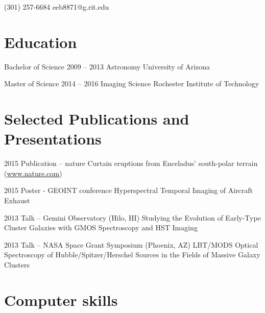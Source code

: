 \documentclass{tccv}
\begin{document}
    {(301) 257-6684}
    {eeb8871@g.rit.edu}

\section{Education}

\begin{yearlist}

\item[Bachelor of Science]{2009 -- 2013}
     {Astronomy}
     {University of Arizona}

\item[Master of Science]{2014 -- 2016}
     {Imaging Science}
     {Rochester Institute of Technology}

\end{yearlist}

\section{Selected Publications and Presentations}

\begin{yearlist}

\item{2015}
	{Publication -- nature}
     {Curtain eruptions from Enceladus' south-polar terrain (\href{http://www.nature.com/nature/journal/v521/n7550/full/nature14368.html}{www.nature.com})}

\item{2015}
	{Poster - GEOINT conference}
	{Hyperspectral Temporal Imaging of Aircraft Exhaust}

\item{2013}
     {Talk -- Gemini Observatory (Hilo, HI)}
     {Studying the Evolution of Early-Type Cluster Galaxies with GMOS Spectroscopy and HST Imaging}

\item{2013}
     {Talk -- NASA Space Grant Symposium (Phoenix, AZ)}
     {LBT/MODS Optical Spectroscopy of Hubble/Spitzer/Herschel Sources in the Fields of Massive Galaxy Clusters}

\end{yearlist}

\section{Computer skills}
\end{document}
